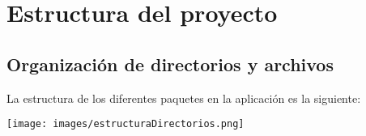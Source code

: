 \documentclass{article}
\begin{document}
\section{Estructura del proyecto}

    \subsection{Organización de directorios y archivos}
    
    La estructura de los diferentes paquetes en la aplicación es la siguiente:
    
    \begin{minipage}{1\textwidth}
        \centering
        \texttt{[image: images/estructuraDirectorios.png]}
    \end{minipage}
    
\end{document}
